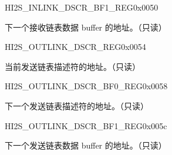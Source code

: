 \begin{register}{H}{I2S\_INLINK\_DSCR\_BF1\_REG}{0x0050}\label{regdesc:I2SINLINKDSCRBF1REG}
%
\regnewline%
\begin{regdesc}\begin{reglist}
\item [I2S\_INLINK\_DSCR\_BF1\_REG]下一个接收链表数据 buffer 的地址。（只读）
\end{reglist}\end{regdesc}
\end{register}


\begin{register}{H}{I2S\_OUTLINK\_DSCR\_REG}{0x0054}\label{regdesc:I2SOUTLINKDSCRREG}
%
\regnewline%
\begin{regdesc}\begin{reglist}
\item [I2S\_OUTLINK\_DSCR\_REG] 当前发送链表描述符的地址。（只读）
\end{reglist}\end{regdesc}
\end{register}


\begin{register}{H}{I2S\_OUTLINK\_DSCR\_BF0\_REG}{0x0058}\label{regdesc:I2SOUTLINKDSCRBF0REG}
%
\regnewline%
\begin{regdesc}\begin{reglist}
\item [I2S\_OUTLINK\_DSCR\_BF0\_REG]下一个发送链表描述符的地址。（只读）
\end{reglist}\end{regdesc}
\end{register}


\begin{register}{H}{I2S\_OUTLINK\_DSCR\_BF1\_REG}{0x005c}\label{regdesc:I2SOUTLINKDSCRBF1REG}
%
\regnewline%
\begin{regdesc}\begin{reglist}
\item [I2S\_OUTLINK\_DSCR\_BF1\_REG]下一个发送链表数据 buffer 的地址。（只读）
\end{reglist}\end{regdesc}
\end{register}


